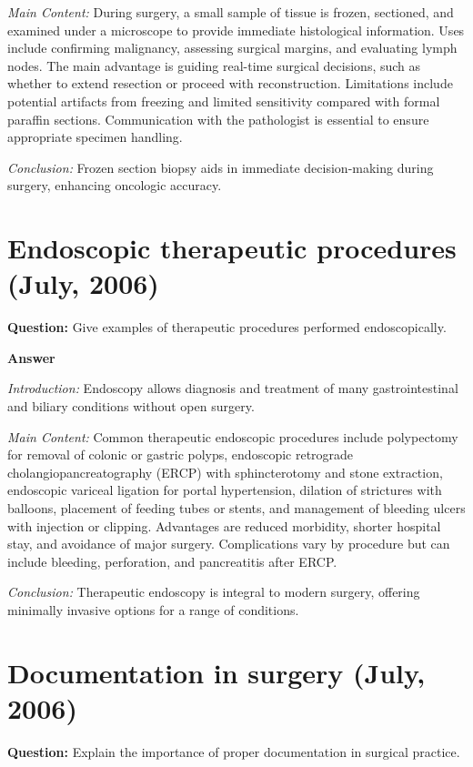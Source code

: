 \documentclass{article}
\begin{document}
\emph{Main Content:} During surgery, a small sample of tissue is frozen, sectioned, and examined under a microscope to provide immediate histological information. Uses include confirming malignancy, assessing surgical margins, and evaluating lymph nodes. The main advantage is guiding real-time surgical decisions, such as whether to extend resection or proceed with reconstruction. Limitations include potential artifacts from freezing and limited sensitivity compared with formal paraffin sections. Communication with the pathologist is essential to ensure appropriate specimen handling.

\emph{Conclusion:} Frozen section biopsy aids in immediate decision-making during surgery, enhancing oncologic accuracy.


\section{Endoscopic therapeutic procedures (July, 2006)}


\textbf{Question:} Give examples of therapeutic procedures performed endoscopically.

\textbf{Answer}

\emph{Introduction:} Endoscopy allows diagnosis and treatment of many gastrointestinal and biliary conditions without open surgery.

\emph{Main Content:} Common therapeutic endoscopic procedures include polypectomy for removal of colonic or gastric polyps, endoscopic retrograde cholangiopancreatography (ERCP) with sphincterotomy and stone extraction, endoscopic variceal ligation for portal hypertension, dilation of strictures with balloons, placement of feeding tubes or stents, and management of bleeding ulcers with injection or clipping. Advantages are reduced morbidity, shorter hospital stay, and avoidance of major surgery. Complications vary by procedure but can include bleeding, perforation, and pancreatitis after ERCP.

\emph{Conclusion:} Therapeutic endoscopy is integral to modern surgery, offering minimally invasive options for a range of conditions.


\section{Documentation in surgery (July, 2006)}


\textbf{Question:} Explain the importance of proper documentation in surgical practice.
\end{document}
